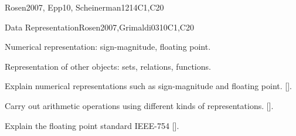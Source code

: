 \begin{syllabus}
\begin{unit}{\DSProofTechniques}{}{Rosen2007, Epp10, Scheinerman12}{14}{C1,C20}
\begin{learningoutcomes}
    \item \DSProofTechniquesLOIdentifyTheUsed [\Assessment]
    \item \DSProofTechniquesLOOutline [\Usage ]
    \item \DSProofTechniquesLOApplyEach [\Usage ]
    \item \DSProofTechniquesLODetermineWhich [\Assessment]
    \item \DSProofTechniquesLOExplainTheIdeas [\Familiarity ]
    \item \DSProofTechniquesLOExplainTheWeak [\Assessment]
    \item \DSProofTechniquesLOStateThe [\Familiarity]
\end{learningoutcomes}
\end{unit}

\begin{unit}{Data Representation}{}{Rosen2007,Grimaldi03}{10}{C1,C20}
    \begin{topics}
        \item Numerical representation: sign-magnitude, floating point.
        \item Representation of other objects: sets, relations, functions.
    \end{topics}

    \begin{learningoutcomes}
        \item Explain numerical representations such as sign-magnitude and floating point. [\Assessment].
        \item Carry out arithmetic operations using different kinds of representations. [\Assessment].
        \item Explain the floating point standard IEEE-754 [\Familiarity].   
    \end{learningoutcomes}
    \end{unit}

\begin{coursebibliography}
\end{coursebibliography}

\end{syllabus}

%

